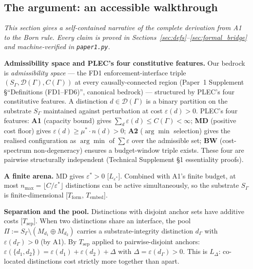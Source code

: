\documentclass[11pt]{article}
\theoremstyle{remark}
\begin{document}
\subsection{The argument: an accessible walkthrough}
\label{sec:walkthrough}\label{sec:argument}

\noindent\textit{This section gives a self-contained narrative of the complete
derivation from A1 to the Born rule.  Every claim is proved in
Sections~\ref{sec:defs}--\ref{sec:formal_bridge} and machine-verified in
\texttt{paper1.py}.}

\medskip

\noindent\textbf{Admissibility space and PLEC's four constitutive features.} Our bedrock is \emph{admissibility space} --- the FD1 enforcement-interface triple $(S_\Gamma, \mathcal{D}(\Gamma), C(\Gamma))$ at every causally-connected region (Paper~1 Supplement \S``Definitions (FD1--FD6)'', canonical bedrock) --- structured by PLEC's four constitutive features.  A distinction $d \in \mathcal{D}(\Gamma)$ is a binary partition on the substrate $S_\Gamma$ maintained against perturbation at cost $\varepsilon(d) > 0$.  PLEC's four features:  \textbf{A1} (capacity bound) gives $\sum_d \varepsilon(d) \le C(\Gamma) < \infty$; \textbf{MD} (positive cost floor) gives $\varepsilon(d) \ge \mu^* \cdot n(d) > 0$; \textbf{A2} ($\arg\min$ selection) gives the realised configuration as $\arg\min$ of $\sum \varepsilon$ over the admissible set; \textbf{BW} (cost-spectrum non-degeneracy) ensures a budget-window triple exists.  These four are pairwise structurally independent (Technical Supplement \S1 essentiality proofs).

\medskip
\noindent\textbf{A finite arena.}  MD gives $\varepsilon^* > 0$ [$L_{\varepsilon^*}$].  Combined with A1's finite budget, at most $n_{\max} = \lfloor C/\varepsilon^* \rfloor$ distinctions can be active simultaneously, so the substrate $S_\Gamma$ is finite-dimensional [$T_{\mathrm{form}}$, $T_{\mathrm{embed}}$].

\medskip
\noindent\textbf{Separation and the pool.}  Distinctions with disjoint anchor sets have additive costs [$T_{\mathrm{sep}}$].  When two distinctions share an interface, the pool $\Pi := S_\Gamma \setminus (M_{d_1} \oplus M_{d_2})$ carries a substrate-integrity distinction $d_\Gamma$ with $\varepsilon(d_\Gamma) > 0$ (by A1).  By $T_{\mathrm{sep}}$ applied to pairwise-disjoint anchors: $\varepsilon(\{d_1, d_2\}) = \varepsilon(d_1) + \varepsilon(d_2) + \Delta$ with $\Delta = \varepsilon(d_\Gamma) > 0$.  This is $L_\Delta$: co-located distinctions cost strictly more together than apart.
\end{document}
